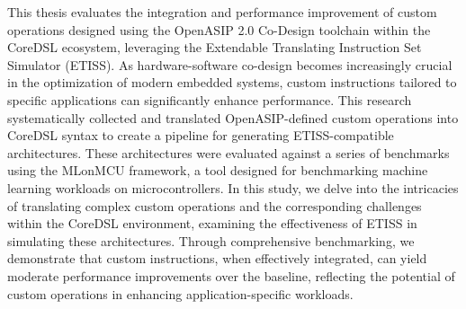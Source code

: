 This thesis evaluates the integration and performance improvement of custom operations designed using the OpenASIP 2.0 Co-Design toolchain within the CoreDSL ecosystem, leveraging the Extendable Translating Instruction Set Simulator (ETISS). As hardware-software co-design becomes increasingly crucial in the optimization of modern embedded systems, custom instructions tailored to specific applications can significantly enhance performance. This research systematically collected and translated OpenASIP-defined custom operations into CoreDSL syntax to create a pipeline for generating ETISS-compatible architectures. These architectures were evaluated against a series of benchmarks using the MLonMCU framework, a tool designed for benchmarking machine learning workloads on microcontrollers. In this study, we delve into the intricacies of translating complex custom operations and the corresponding challenges within the CoreDSL environment, examining the effectiveness of ETISS in simulating these architectures. Through comprehensive benchmarking, we demonstrate that custom instructions, when effectively integrated, can yield moderate performance improvements over the baseline, reflecting the potential of custom operations in enhancing application-specific workloads.